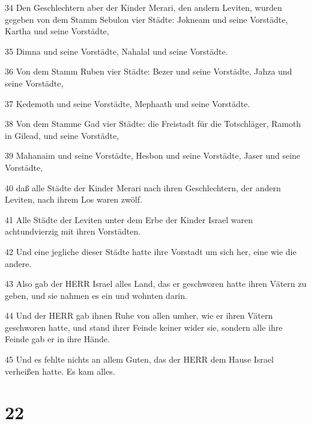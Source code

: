 \par 34 Den Geschlechtern aber der Kinder Merari, den andern Leviten, wurden gegeben von dem Stamm Sebulon vier Städte: Jokneam und seine Vorstädte, Kartha und seine Vorstädte,
\par 35 Dimna und seine Vorstädte, Nahalal und seine Vorstädte.
\par 36 Von dem Stamm Ruben vier Städte: Bezer und seine Vorstädte, Jahza und seine Vorstädte,
\par 37 Kedemoth und seine Vorstädte, Mephaath und seine Vorstädte.
\par 38 Von dem Stamme Gad vier Städte: die Freistadt für die Totschläger, Ramoth in Gilead, und seine Vorstädte,
\par 39 Mahanaim und seine Vorstädte, Hesbon und seine Vorstädte, Jaser und seine Vorstädte,
\par 40 daß alle Städte der Kinder Merari nach ihren Geschlechtern, der andern Leviten, nach ihrem Los waren zwölf.
\par 41 Alle Städte der Leviten unter dem Erbe der Kinder Israel waren achtundvierzig mit ihren Vorstädten.
\par 42 Und eine jegliche dieser Städte hatte ihre Vorstadt um sich her, eine wie die andere.
\par 43 Also gab der HERR Israel alles Land, das er geschworen hatte ihren Vätern zu geben, und sie nahmen es ein und wohnten darin.
\par 44 Und der HERR gab ihnen Ruhe von allen umher, wie er ihren Vätern geschworen hatte, und stand ihrer Feinde keiner wider sie, sondern alle ihre Feinde gab er in ihre Hände.
\par 45 Und es fehlte nichts an allem Guten, das der HERR dem Hause Israel verheißen hatte. Es kam alles.

\chapter{22}

